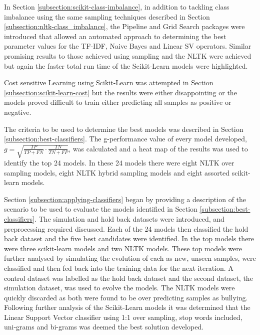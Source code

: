 In Section \ref{subsection:scikit-class-imbalance}, in addition to tackling class imbalance using the same sampling techniques described in Section \ref{subsection:nltk-class_imbalance}, the Pipeline and Grid Search packages were introduced that allowed an automated approach to determining the best parameter values for the TF-IDF, Naive Bayes and Linear SV operators. Similar promising results to those achieved using sampling and the NLTK were achieved but again the faster total run time of the Scikit-Learn models were highlighted.

Cost sensitive Learning using Scikit-Learn was attempted in Section 
\ref{subsection:scikit-learn-cost} but the results were either disappointing or the models proved difficult to train either predicting all samples as positive or negative. 

The criteria to be used to determine the best models was described in Section \ref{subsection:best-classifiers}. The g-performance value of every model developed, $g =\sqrt{\frac{TP}{TP + FN} \cdot \frac{TN}{TN + FP}}$, was calculated and a heat map of the results was used to identify the top 24 models. In these 24 models there were eight NLTK over sampling models, eight NLTK hybrid sampling models and eight assorted scikit-learn models.

Section \ref{subsection:applying-classifiers} began by providing a description of the scenario to be used to evaluate the models identified in Section \ref{subsection:best-classifiers}. The simulation and hold back datasets were introduced, and preprocessing required discussed. Each of the 24 models then classified the hold back dataset and the five best candidates were identified. In the top models there were three scikit-learn models and two NLTK models. These top models were further analysed by simulating the evolution of each as new, unseen samples, were classified and then fed back into the training data for the next iteration. A control dataset was labelled as the hold back dataset and the second dataset, the simulation dataset, was used to evolve the models. The NLTK models were quickly discarded as both were found to be over predicting samples as bullying. Following further analysis of the Scikit-Learn models it was determined that the Linear Support Vector classifier using 1:1 over sampling, stop words included, uni-grams and bi-grams was deemed the best solution developed.